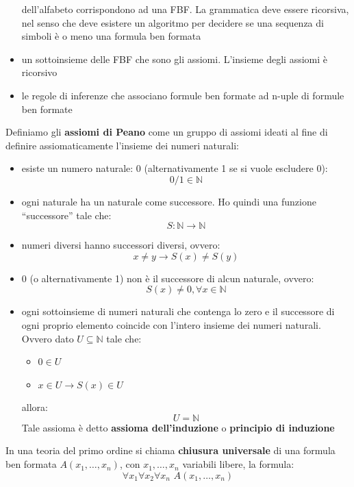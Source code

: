 \documentclass[a4paper,12pt, oneside]{book}
\begin{document}
\begin{shaded}
\begin{definizione}
\begin{itemize}
      dell'alfabeto corrispondono ad una FBF. La grammatica deve essere
      ricorsiva, nel senso che deve esistere un algoritmo per decidere se una
      sequenza di simboli è o meno una formula ben formata 
      \item un sottoinsieme delle FBF che sono gli assiomi. L'insieme degli
      assiomi è ricorsivo
      \item le regole di inferenze che associano formule ben formate ad n-uple
      di formule ben formate
    \end{itemize}
  \end{definizione}
  \begin{definizione}
    Definiamo gli \textbf{assiomi di Peano} come un gruppo di assiomi ideati al
    fine di definire assiomaticamente l'insieme dei numeri naturali:
    \begin{itemize}
      \item esiste un numero naturale: 0 (alternativamente 1 se si vuole escludere
      0):
      \[0/1\in \mathbb{N}\]
      \item ogni naturale ha un naturale come successore. Ho quindi una funzione
      ``successore'' tale che:
      \[S:\mathbb{N}\to\mathbb{N}\]
      \item numeri diversi hanno successori diversi, ovvero:
      \[x\neq y\to S(x)\neq S(y)\]
      \item 0 (o alternativamente 1) non è il successore di alcun naturale,
      ovvero:
      \[S(x)\neq 0, \forall x\in \mathbb{N}\]
      \item ogni sottoinsieme di numeri naturali che contenga lo zero e il
      successore di ogni proprio elemento coincide con l'intero insieme dei
      numeri 
      naturali. Ovvero dato $U\subseteq \mathbb{N}$ tale che:
      \begin{itemize}
        \item $0\in U$
        \item $x\in U\to S(x)\in U$
      \end{itemize}
      allora:
      \[U=\mathbb{N}\]
      Tale assioma è detto \textbf{assioma dell'induzione} o \textbf{principio di
        induzione} 
    \end{itemize}
  \end{definizione}
  \begin{definizione}
    In una teoria del primo ordine si chiama \textbf{chiusura universale} di una
    formula ben formata $A(x_1,\ldots,x_n)$, con $x_1,\ldots,x_n$ variabili
    libere, la formula:
    \[\forall x_1\forall x_2\forall x_n\,\,A(x_1,\ldots,x_n)\]

\end{definizione}
\end{shaded}
\end{document}
